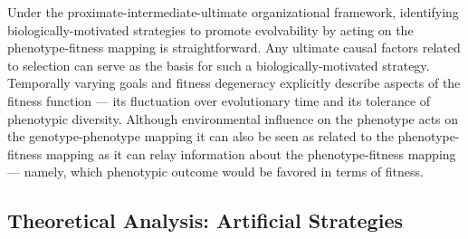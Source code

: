 Under the proximate-intermediate-ultimate organizational framework, identifying biologically-motivated strategies to promote evolvability by acting on the phenotype-fitness mapping is straightforward.
Any ultimate causal factors related to selection can serve as the basis for such a biologically-motivated strategy.
Temporally varying goals and fitness degeneracy explicitly describe aspects of the fitness function --- its fluctuation over evolutionary time and its tolerance of phenotypic diversity.
Although environmental influence on the phenotype acts on the genotype-phenotype mapping it can also be seen as related to the phenotype-fitness mapping as it can relay information about the phenotype-fitness mapping --- namely, which phenotypic outcome would be favored in terms of fitness.

\subsection{Theoretical Analysis: Artificial Strategies}

